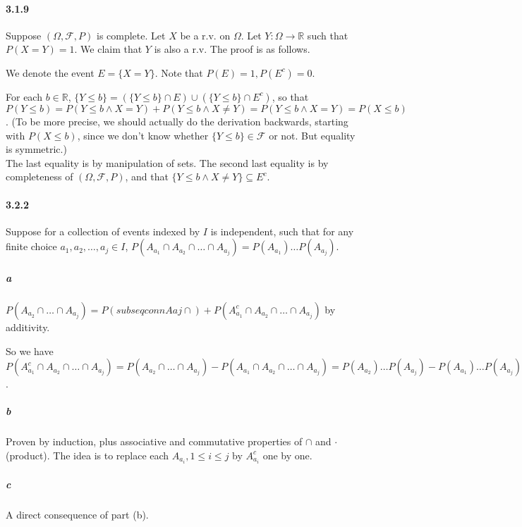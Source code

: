 \documentclass[a4paper]{article}
\newcommand{\alg}[0]{\mathcal{F}} %
\newcommand{\triple}[0]{(\Omega, \alg, P)} %
\newcommand{\real}[0]{\mathbb{R}} %
\newcommand{\seq}[2]{#1_1,#1_2,\dots,#1_{#2}} %
\newcommand{\subseqconn}[4]{#1_{#2_1} #4 #1_{#2_2} #4 \dots #4 #1_{#2_{#3}}} %
\begin{document}
\paragraph{3.1.9} Suppose $\triple$ is complete. Let $X$ be a r.v. on $\Omega$. Let $Y: \Omega\rightarrow\real$ such that $P(X=Y)=1$. We claim that $Y$ is also a r.v. The proof is as follows.

We denote the event $E=\{X=Y\}$. Note that $P(E) = 1, P(E^c) = 0$.

For each $b\in\real$, $\{Y\leq b\} = (\{Y\leq b\}\cap E) \cup (\{Y\leq b\}\cap E^c)$, so that $P(Y\leq b) = P(Y\leq b\land X=Y) + P(Y\leq b\land X\neq Y) = P(Y\leq b\land X=Y) = P(X\leq b)$. (To be more precise, we should actually do the derivation backwards, starting with $P(X\leq b)$, since we don't know whether $\{Y\leq b\}\in \alg$ or not. But equality is symmetric.)\\
The last equality is by manipulation of sets. The second last equality is by completeness of $\triple$, and that $\{Y\leq b\land X\neq Y\}\subseteq E^c$.

\paragraph{3.2.2} Suppose for a collection of events indexed by $I$ is independent, such that for any finite choice $\seq{a}{j}\in I$, $P(\subseqconn{A}{a}{j}{\cap})=P(A_{a_1})\dots P(A_{a_j})$.

\subparagraph{a} $P(A_{a_2}\cap\dots\cap A_{a_j}) = P(subseqconn{A}{a}{j}{\cap}) + P(A_{a_1}^c\cap A_{a_2}\cap\dots\cap A_{a_j})$ by additivity.

So we have $P(A_{a_1}^c\cap A_{a_2}\cap\dots\cap A_{a_j}) = P(A_{a_2}\cap\dots\cap A_{a_j}) - P(\subseqconn{A}{a}{j}{\cap}) = P(A_{a_2})\dots P(A_{a_j}) - P(A_{a_1})\dots P(A_{a_j}) = (1-P(A_{a_1})P(A_{a_2})\dots P(A_{a_j}) = P(A_{a_1}^c)P(A_{a_2})\dots P(A_{a_j})$.

\subparagraph{b} Proven by induction, plus associative and commutative properties of $\cap$ and $\cdot$ (product). The idea is to replace each $A_{a_i}, 1\leq i\leq j$ by $A_{a_i}^c$ one by one.

\subparagraph{c} A direct consequence of part (b).
\end{document}
